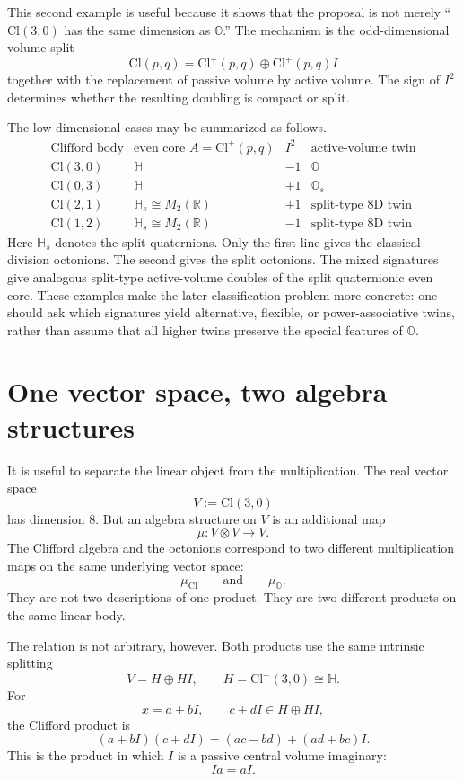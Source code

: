 \documentclass[11pt]{article}
\newcommand{\Cl}{\mathrm{Cl}}
\newcommand{\OO}{\mathbb O}
\begin{document}
This second example is useful because it shows that the proposal is not merely
``$\Cl(3,0)$ has the same dimension as $\mathbb O$.'' The mechanism is the
odd-dimensional volume split
\[
\Cl(p,q)=\Cl^+(p,q)\oplus\Cl^+(p,q)I
\]
together with the replacement of passive volume by active volume. The sign of
$I^2$ determines whether the resulting doubling is compact or split.

The low-dimensional cases may be summarized as follows.
\[
\begin{array}{c|c|c|c}
\text{Clifford body} & \text{even core }A=\Cl^+(p,q) & I^2 & \text{active-volume twin}\\
\hline
\Cl(3,0) & \mathbb H & -1 & \mathbb O\\
\Cl(0,3) & \mathbb H & +1 & \mathbb O_s\\
\Cl(2,1) & \mathbb H_s\cong M_2(\mathbb R) & +1 & \text{split-type }8\text{D twin}\\
\Cl(1,2) & \mathbb H_s\cong M_2(\mathbb R) & -1 & \text{split-type }8\text{D twin}
\end{array}
\]
Here $\mathbb H_s$ denotes the split quaternions. Only the first line gives the
classical division octonions. The second gives the split octonions. The mixed
signatures give analogous split-type active-volume doubles of the split
quaternionic even core. These examples make the later classification problem
more concrete: one should ask which signatures yield alternative, flexible, or
power-associative twins, rather than assume that all higher twins preserve the
special features of $\mathbb O$.

\section{One vector space, two algebra structures}

It is useful to separate the linear object from the multiplication. The real
vector space
\[
V:=\Cl(3,0)
\]
has dimension $8$. But an algebra structure on $V$ is an additional map
\[
\mu:V\otimes V\to V.
\]
The Clifford algebra and the octonions correspond to two different
multiplication maps on the same underlying vector space:
\[
\mu_{\Cl}
\qquad\text{and}\qquad
\mu_{\OO}.
\]
They are not two descriptions of one product. They are two different products
on the same linear body.

The relation is not arbitrary, however. Both products use the same intrinsic
splitting
\[
V=H\oplus HI,
\qquad
H=\Cl^+(3,0)\cong\mathbb H.
\]
For
\[
x=a+bI,
\qquad
c+dI\in H\oplus HI,
\]
the Clifford product is
\[
(a+bI)(c+dI)
=
(ac-bd)+(ad+bc)I.
\]
This is the product in which $I$ is a passive central volume imaginary:
\[
Ia=aI.
\]
\end{document}
